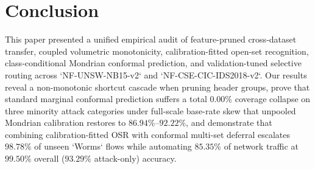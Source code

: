 ﻿\documentclass[conference]{IEEEtran}
\begin{document}
\section{Conclusion}
This paper presented a unified empirical audit of feature-pruned cross-dataset transfer, coupled volumetric monotonicity, calibration-fitted open-set recognition, class-conditional Mondrian conformal prediction, and validation-tuned selective routing across `NF-UNSW-NB15-v2` and `NF-CSE-CIC-IDS2018-v2`. Our results reveal a non-monotonic shortcut cascade when pruning header groups, prove that standard marginal conformal prediction suffers a total $0.00\%$ coverage collapse on three minority attack categories under full-scale base-rate skew that unpooled Mondrian calibration restores to $86.94\%$--$92.22\%$, and demonstrate that combining calibration-fitted OSR with conformal multi-set deferral escalates $98.78\%$ of unseen `Worms` flows while automating $85.35\%$ of network traffic at $99.50\%$ overall ($93.29\%$ attack-only) accuracy.
\end{document}
